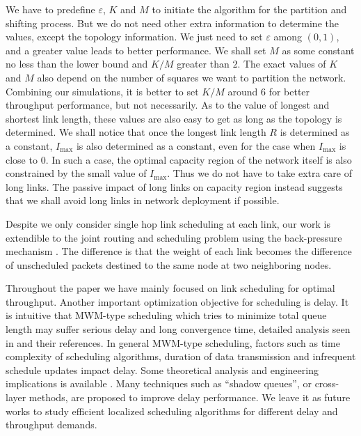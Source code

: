 \documentclass[journal]{IEEEtran}
\begin{document}
 We have to predefine $\varepsilon$, $K$ and $M$ to initiate the algorithm for the partition and shifting process. But we do not need other extra information to determine the values, except the topology information. We just need to set $\varepsilon$ among $(0,1)$, and a greater value leads to better performance. We shall set $M$ as some constant no less than the lower bound and $K/M$ greater than $2$. The exact values of $K$ and $M$ also depend on the number of squares we want to partition the network. Combining our simulations, it is better to set $K/M$ around $6$ for better throughput performance, but not necessarily.
As to the value of longest and shortest link length, these values are also easy to get as long as the topology is determined. We shall notice that once the longest link length $R$ is determined as a constant, $I_{\max}$ is also determined as a constant, even for the case  when $I_{\max}$ is close to $0$. In such a case, the optimal capacity region of the network itself is also constrained by the small value of  $I_{\max}$. Thus we do not have to take extra care of long links. The passive impact of long links on capacity region instead suggests that we shall avoid long links in network deployment if possible.

Despite we only consider  single hop link scheduling at each link, our work is  extendible to  the joint routing and scheduling problem using the back-pressure mechanism \cite{sha07}. The difference is that the weight of each link becomes the difference of unscheduled packets destined to the same node at  two neighboring nodes.

Throughout the paper we have mainly focused on link scheduling for optimal throughput. Another important optimization objective for scheduling is delay. It is intuitive that MWM-type scheduling which tries to minimize total queue length may suffer serious delay and long convergence time, detailed analysis seen in \cite{bui-info09} \cite{lei-info08} and their references.
 In general MWM-type scheduling,  factors such as  time complexity of  scheduling algorithms, duration of data transmission and infrequent schedule updates impact delay. Some theoretical analysis and engineering implications is available \cite{yi-mobihoc09}.
Many techniques such as ``shadow queues''\cite{bui-info09}, or cross-layer methods\cite{ruogu-ton11}, are proposed to improve delay performance. We leave it as future works to study efficient   localized scheduling algorithms for different delay and throughput demands.
\end{document}
